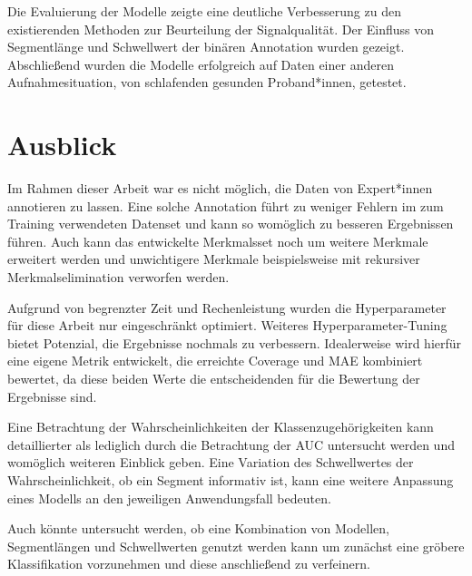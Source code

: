 Die Evaluierung der Modelle zeigte eine deutliche Verbesserung zu den existierenden Methoden zur Beurteilung der Signalqualität. Der Einfluss von Segmentlänge und Schwellwert der binären Annotation wurden gezeigt. Abschließend wurden die Modelle erfolgreich auf Daten einer anderen Aufnahmesituation, von schlafenden gesunden Proband*innen, getestet.

\section{Ausblick}

Im Rahmen dieser Arbeit war es nicht möglich, die Daten von Expert*innen annotieren zu lassen. Eine solche Annotation führt zu weniger Fehlern im zum Training verwendeten Datenset und kann so womöglich zu besseren Ergebnissen führen. Auch kann das entwickelte Merkmalsset noch um weitere Merkmale erweitert werden und unwichtigere Merkmale beispielsweise mit rekursiver Merkmalselimination verworfen werden.

Aufgrund von begrenzter Zeit und Rechenleistung wurden die Hyperparameter für diese Arbeit nur eingeschränkt optimiert. Weiteres Hyperparameter-Tuning bietet Potenzial, die Ergebnisse nochmals zu verbessern. Idealerweise wird hierfür eine eigene Metrik entwickelt, die erreichte Coverage und \ac{MAE} kombiniert bewertet, da diese beiden Werte die entscheidenden für die Bewertung der Ergebnisse sind.

Eine Betrachtung der Wahrscheinlichkeiten der Klassenzugehörigkeiten kann detaillierter als lediglich durch die Betrachtung der \ac{AUC} untersucht werden und womöglich weiteren Einblick geben. Eine Variation des Schwellwertes der Wahrscheinlichkeit, ob ein Segment informativ ist, kann eine weitere Anpassung eines Modells an den jeweiligen Anwendungsfall bedeuten.

Auch könnte untersucht werden, ob eine Kombination von Modellen, Segmentlängen und Schwellwerten genutzt werden kann um zunächst eine gröbere Klassifikation vorzunehmen und diese anschließend zu verfeinern.



